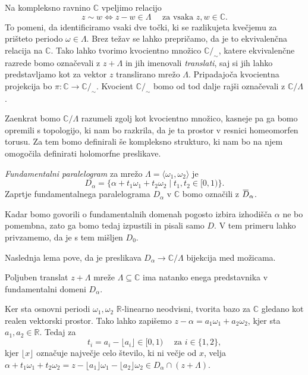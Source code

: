 \documentclass[mat1]{fmfdelo}
\newcommand{\R}{\mathbb R}
\newcommand{\C}{\mathbb C}
\newcommand{\om}{\omega}
\newcommand{\ols}[1]{\mskip.5\thinmuskip\overline{\mskip-.5\thinmuskip {#1} \mskip-.5\thinmuskip}\mskip.5\thinmuskip} %
\theoremstyle{definition}
\begin{document}
Na kompleksno ravnino $\C$ vpeljimo relacijo 
\[
    z \sim w \iff z - w \in \Lambda \quad \text{ za vsaka $z,w \in \C$.}
\]
To pomeni, da identificiramo vsaki dve točki, ki se razlikujeta kvečjemu za prišteto periodo $\omega \in \Lambda$. 
Brez težav se lahko prepričamo, da je to ekvivalenčna relacija na $\C$. Tako lahko tvorimo kvocientno množico $\C/_{\sim}$, katere ekvivalenčne razrede bomo označevali z $z + \Lambda$ in jih imenovali \emph{translati}, saj si jih lahko predstavljamo kot za vektor $z$ translirano mrežo $\Lambda$. Pripadajoča kvocientna projekcija bo $\pi : \C \to \C/_{\sim}$. Kvocient $\C/_{\sim}$ bomo od tod dalje rajši označevali z $\C/\Lambda$. 

Zaenkrat bomo $\C/\Lambda$ razumeli zgolj kot kvocientno množico, kasneje pa ga bomo opremili s topologijo, ki nam bo razkrila, da je ta prostor v resnici homeomorfen torusu. Za tem bomo definirali še kompleksno strukturo, ki nam bo na njem omogočila definirati holomorfne preslikave.


\begin{definicija}
    \emph{Fundamentalni paralelogram} za mrežo $\Lambda = \langle \om_1, \om_2 \rangle$ je
    \[
        D_{\alpha} = \{\alpha + t_1 \om_1 + t_2 \om_2 \mid t_1, t_2 \in [0,1)\}.
    \]
    Zaprtje fundamentalnega paralelograma $D_\alpha$ v $\C$ bomo označili z $\ols{D}_\alpha$. 
\end{definicija}

\begin{opomba}
    Kadar bomo govorili o fundamentalnih domenah pogosto izbira izhodišča $\alpha$ ne bo pomembna, zato ga bomo tedaj izpustili in pisali samo $D$. V tem primeru lahko privzamemo, da je s tem mišljen $D_0$. 
\end{opomba}

Naslednja lema pove, da je preslikava $D_\alpha \to \C/\Lambda$ bijekcija med možicama. 

\begin{lema}
    \label{enolicni predstavnik}
    Poljuben translat $z + \Lambda$ mreže $\Lambda \subseteq \C$ ima natanko enega predstavnika v fundamentalni domeni $D_\alpha$. 
\end{lema}

\begin{dokaz}
    Ker sta osnovni periodi $\omega_1, \omega_2$ $\R$-linearno neodvisni, tvorita bazo za $\C$ gledano kot realen vektorski prostor. Tako lahko zapišemo $z - \alpha = a_1 \om_1 + a_2 \om_2$, kjer sta $a_1, a_2 \in \R$. Tedaj za 
    \[
        t_i = a_i - \lfloor a_i \rfloor \in [0,1) \quad \text{ za $i \in \{1,2\}$},
    \] 
    kjer $\lfloor x \rfloor$ označuje največje celo število, ki ni večje od $x$, velja $\alpha + t_1\om_1 + t_2 \om_2 = z - \lfloor a_1 \rfloor \om_1 - \lfloor a_2 \rfloor \om_2 \in D_\alpha \cap (z + \Lambda)$.
\end{dokaz}
\end{document}
